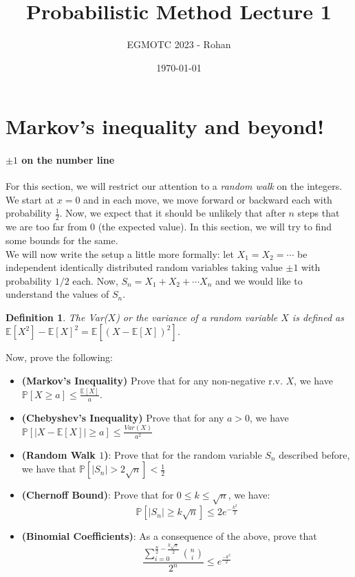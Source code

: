 \documentclass[12pt]{article}
\title{Probabilistic Method Lecture 1}
\author{EGMOTC 2023 - Rohan}
\date{\today}
\newcommand{\EE}{\mathbb{E}}
\newcommand{\PP}{\mathbb{P}}
\begin{document}
\maketitle

\newcommand{\localtextbulletone}{\textcolor{black}{\raisebox{.45ex}{\rule{.6ex}{.6ex}}}}
\renewcommand{\labelitemi}{\localtextbulletone}

\newtheorem{definition}{Definition}

\thispagestyle{empty}

\section*{Markov's inequality and beyond!}

\paragraph{$\pm 1$ on the number line}

For this section, we will restrict our attention to a \textit{random walk} on the integers. We start at $x=0$ and in each move, we move forward or backward each with probability $\frac{1}{2}$. Now, we expect that it should be unlikely that after $n$ steps that we are too far from $0$ (the expected value). In this section, we will try to find some bounds for the same.\\

We will now write the setup a little more formally: let $X_1=X_2=\cdots $ be independent identically distributed random variables taking value $\pm 1$ with probability $1/2$ each. Now, $S_n=X_1+X_2+\cdots X_n$ and we would like to understand the values of $S_n$.

\begin{definition}
    The Var($X$) or the variance of a random variable $X$ is defined as $\EE[X^2]-\EE[X]^2=\EE[(X-\EE[X])^2]$.
\end{definition}
Now, prove the following:
\begin{itemize}
    \item \textbf{(Markov's Inequality)} Prove that for any non-negative r.v. $X$, we have $\PP[X\ge a]\le \frac{\EE[X]}{a}$.
    \item \textbf{(Chebyshev's Inequality)} Prove that for any $a>0$, we have $\PP[|X-\EE[X]|\ge a]\le \frac{Var(X)}{a^2}$
    \item \textbf{(Random Walk $1$)}: Prove that for the random variable $S_n$ described before, we have that $\PP[|S_n|>2\sqrt{n}]<\frac{1}{2}$
    \item \textbf{(Chernoff Bound)}: Prove that for $0\le k \le \sqrt{n}$, we have: \[\PP[|S_n|\ge k\sqrt{n}]\le 2e^{-\frac{k^2}{2}}\]
    \item \textbf{(Binomial Coefficients)}: As a consequence of the above, prove that \[\frac{\sum\limits_{i=0}^{\frac{n}{2}-\frac{k\sqrt{n}}{2}} \binom{n}{i}}{2^n}\le e^{\frac{-k^2}{2}}\]
\end{itemize}
\end{document}
